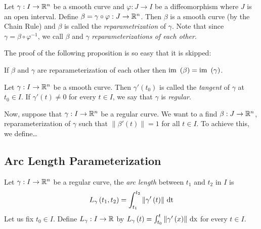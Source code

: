 \begin{definition}[Reparametrization]
    Let $\gamma : I \to \mathbb R ^{n}$ be a smooth curve and $\varphi : J \to I$ be a diffeomorphism where $J$ is an open interval. Define $\beta = \gamma \circ \varphi : J \to \mathbb R ^{n}$. Then $\beta$ is a smooth curve (by the Chain Rule) and $\beta$ is called the \textit{reparametrization} of $\gamma$. Note that since $\gamma = \beta \circ \varphi ^{-1}$, we call $\beta$ and $\gamma$ \textit{reparameterizations of each other}.
    \label{def:reparametrization}
\end{definition}

The proof of the following proposition is so easy that it is skipped:
\begin{proposition}
    If $\beta$ and $\gamma$ are reparameterization of each other then ${\text{im }} \left( \beta \right) = {\text{im }} \left( \gamma \right)$.
    \label{prop:im-of-reparamterization}
\end{proposition}

\begin{definition}
    Let $\gamma : I \to \mathbb R ^{n}$ be a smooth curve. Then $\gamma ' \left( t_0 \right)$ is called the \textit{tangent} of $\gamma$ at $t_{0} \in I$. If $\gamma ' \left( t \right) \ne 0$ for every $t\in I$, we say that $\gamma$ is \textit{regular}.
    \label{def:regular}
\end{definition}

Now, suppose that $\gamma : I \to \mathbb R ^{n}$ be a regular curve. We want to a find $\beta : J \to \mathbb R^{n}$, reparameterization of $\gamma$ such that $\lVert \beta ' \left( t \right) \rVert = 1$ for all $t\in I$. To achieve this, we define\ldots

\subsection{Arc Length Parameterization}

\begin{definition}
    Let $\gamma : I \to \mathbb R ^{n}$ be a regular curve, the \textit{arc length} between $t_1$ and $t_2$ in $I$ is
    \begin{equation*}
	L_{\gamma} \left( t_{1}, t_{2} \right) = \int_{t_{1}}^{t_{2}} \left\lVert \gamma ' \left( t \right) \right\rVert \, \mathrm{dt}
    \end{equation*}
    Let us fix $t_{0} \in I$. Define $L_{\gamma} : I \to \mathbb R$ by $L_{\gamma} \left( t \right) = \int_{t_{0}}^{t} \left\lVert \gamma ' \left( x \right) \right\rVert\, \text{dx}$ for every $t\in I$.
    \label{def:arc-length}
\end{definition}

